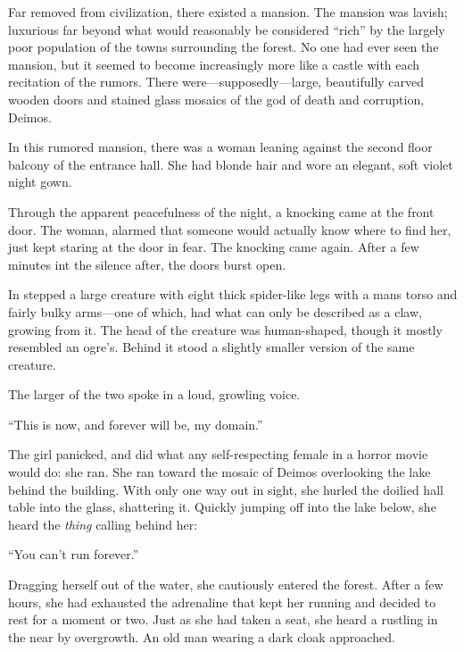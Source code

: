 \noindent
Far removed from civilization, there existed a mansion.
The mansion was lavish; luxurious far beyond what would reasonably be considered ``rich'' by the largely poor population of the towns surrounding the forest.
No one had ever seen the mansion, but it seemed to become increasingly more like a castle with each recitation of the rumors.
There were---supposedly---large, beautifully carved wooden doors and stained glass mosaics of the god of death and corruption, Deimos.


In this rumored mansion, there was a woman leaning against the second floor balcony of the entrance hall.
She had blonde hair and wore an elegant, soft violet night gown.


Through the apparent peacefulness of the night, a knocking came at the front door.
The woman, alarmed that someone would actually know where to find her, just kept staring at the door in fear.
The knocking came again.  After a few minutes int the silence after, the doors burst open.


In stepped a large creature with eight thick spider-like legs with a mans torso and fairly bulky arms---one of which, had what can only be described as a claw, growing from it.
The head of the creature was human-shaped, though it mostly resembled an ogre's.
Behind it stood a slightly smaller version of the same creature.


The larger of the two spoke in a loud, growling voice.
\VV


``This is now, and forever will be, my domain.''
\VV


\noindent
The girl panicked, and did what any self-respecting female in a horror movie would do: she ran.
She ran toward the mosaic of Deimos overlooking the lake behind the building.
With only one way out in sight, she hurled the doilied hall table into the glass, shattering it.
Quickly jumping off into the lake below, she heard the \textit{thing} calling behind her:
\VV


``You can't run forever.''
\VV


\noindent
Dragging herself out of the water, she cautiously entered the forest.
After a few hours, she had exhausted the adrenaline that kept her running and decided to rest for a moment or two.
Just as she had taken a seat, she heard a rustling in the near by overgrowth.
An old man wearing a dark cloak approached.
\VV


